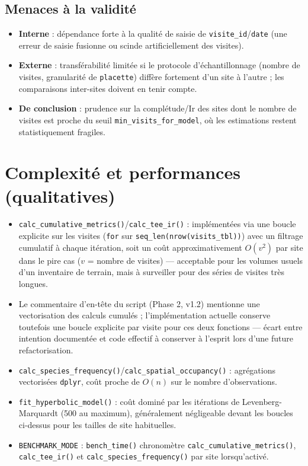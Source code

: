 \documentclass[11pt,a4paper]{article}
\begin{document}
\subsection{Menaces à la validité}
\begin{itemize}[leftmargin=1.2cm]
  \item \textbf{Interne} : dépendance forte à la qualité de saisie de \texttt{visite\_id}/\texttt{date} (une erreur de saisie fusionne ou scinde artificiellement des visites).
  \item \textbf{Externe} : transférabilité limitée si le protocole d'échantillonnage (nombre de visites, granularité de \texttt{placette}) diffère fortement d'un site à l'autre ; les comparaisons inter-sites doivent en tenir compte.
  \item \textbf{De conclusion} : prudence sur la complétude/Ir des sites dont le nombre de visites est proche du seuil \texttt{min\_visits\_for\_model}, où les estimations restent statistiquement fragiles.
\end{itemize}

\section{Complexité et performances (qualitatives)}
\begin{itemize}[leftmargin=1.2cm]
  \item \texttt{calc\_cumulative\_metrics()}/\texttt{calc\_tee\_ir()} : implémentées via une boucle explicite sur les visites (\texttt{for} sur \texttt{seq\_len(nrow(visits\_tbl))}) avec un filtrage cumulatif à chaque itération, soit un coût approximativement $O(v^2)$ par site dans le pire cas ($v$ = nombre de visites) — acceptable pour les volumes usuels d'un inventaire de terrain, mais à surveiller pour des séries de visites très longues.
  \item Le commentaire d'en-tête du script (Phase 2, v1.2) mentionne une \og{}vectorisation des calculs cumulés\fg{} ; l'implémentation actuelle conserve toutefois une boucle explicite par visite pour ces deux fonctions — écart entre intention documentée et code effectif à conserver à l'esprit lors d'une future refactorisation.
  \item \texttt{calc\_species\_frequency()}/\texttt{calc\_spatial\_occupancy()} : agrégations vectorisées \texttt{dplyr}, coût proche de $O(n)$ sur le nombre d'observations.
  \item \texttt{fit\_hyperbolic\_model()} : coût dominé par les itérations de Levenberg-Marquardt (500 au maximum), généralement négligeable devant les boucles ci-dessus pour les tailles de site habituelles.
  \item \texttt{BENCHMARK\_MODE} : \texttt{bench\_time()} chronomètre \texttt{calc\_cumulative\_metrics()}, \texttt{calc\_tee\_ir()} et \texttt{calc\_species\_frequency()} par site lorsqu'activé.
\end{itemize}
\end{document}
